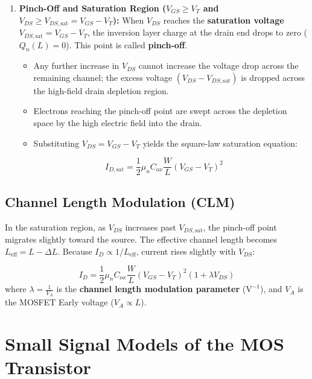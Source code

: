 \documentclass[12pt,a4paper]{article}
\begin{document}
\begin{enumerate}[label=\arabic*., leftmargin=*]
  \item \textbf{Pinch-Off and Saturation Region ($V_{GS} \ge V_T$ and $V_{DS} \ge V_{DS,\text{sat}} = V_{GS} - V_T$):}
  When $V_{DS}$ reaches the \textbf{saturation voltage} $V_{DS,\text{sat}} = V_{GS} - V_T$, the inversion layer charge at the drain end drops to zero ($Q_n(L) = 0$). This point is called \textbf{pinch-off}.
  \begin{itemize}
    \item Any further increase in $V_{DS}$ cannot increase the voltage drop across the remaining channel; the excess voltage $(V_{DS} - V_{DS,\text{sat}})$ is dropped across the high-field drain depletion region.
    \item Electrons reaching the pinch-off point are swept across the depletion space by the high electric field into the drain.
    \item Substituting $V_{DS} = V_{GS} - V_T$ yields the square-law saturation equation:
  \end{itemize}
  \begin{equation}
    I_{D,\text{sat}} = \frac{1}{2} \mu_n C_{ox} \frac{W}{L} (V_{GS} - V_T)^2
  \end{equation}
\end{enumerate}

\subsection{Channel Length Modulation (CLM)}
In the saturation region, as $V_{DS}$ increases past $V_{DS,\text{sat}}$, the pinch-off point migrates slightly toward the source. The effective channel length becomes $L_{\text{eff}} = L - \Delta L$. Because $I_D \propto 1/L_{\text{eff}}$, current rises slightly with $V_{DS}$:

\begin{tcolorbox}[formulabox, title={\textbf{MOSFET Saturation Current with Channel Length Modulation}}]
\begin{equation}
  I_D = \frac{1}{2} \mu_n C_{ox} \frac{W}{L} (V_{GS} - V_T)^2 \left( 1 + \lambda V_{DS} \right)
\end{equation}
where $\lambda = \frac{1}{V_A}$ is the \textbf{channel length modulation parameter} ($\text{V}^{-1}$), and $V_A$ is the MOSFET Early voltage ($V_A \propto L$).
\end{tcolorbox}

\section{Small Signal Models of the MOS Transistor}
\end{document}
